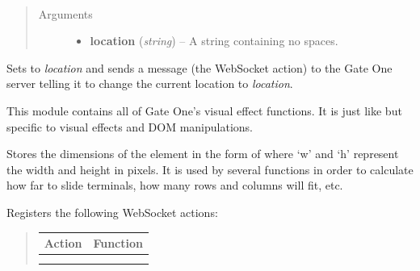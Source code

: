 \documentclass[letterpaper,10pt,openany]{sphinxmanual}
\begin{document}
\begin{fulllineitems}
\begin{fulllineitems}
\begin{fulllineitems}
\end{fulllineitems}



\begin{fulllineitems}
\label{Developer/js_gateone:GateOne.Net.setLocation}~\begin{quote}\begin{description}
\item[{Arguments}] \leavevmode\begin{itemize}
\item {} 
\textbf{location} (\emph{string}) -- A string containing no spaces.

\end{itemize}

\end{description}\end{quote}

Sets  to \emph{location} and sends a message (the  WebSocket action) to the Gate One server telling it to change the current location to \emph{location}.

\end{fulllineitems}


\end{fulllineitems}



\begin{fulllineitems}
\label{Developer/js_gateone:GateOne.Visual}
This module contains all of Gate One's visual effect functions.  It is just like {\hyperref[Developer/js_gateone:GateOne.Utils]{}} but specific to visual effects and DOM manipulations.


\begin{fulllineitems}
\label{Developer/js_gateone:GateOne.Visual.goDimensions}
Stores the dimensions of the  element in the form of  where `w' and `h' represent the width and height in pixels.  It is used by several functions in order to calculate how far to slide terminals, how many rows and columns will fit, etc.

Registers the following WebSocket actions:
\begin{quote}

\begin{tabulary}{\linewidth}{|L|L|}
\hline
\textsf{\relax 
Action
} & \textsf{\relax 
Function
}\\
\hline
{}
 & 
{\hyperref[Developer/js_gateone:GateOne.Visual.serverMessageAction]{}}
\\
\hline
{}
 & 
{\hyperref[Developer/js_gateone:GateOne.Visual.userMessageAction]{}}
\\
\hline\end{tabulary}


\end{quote}
\end{fulllineitems}
\end{fulllineitems}
\end{fulllineitems}
\end{document}
